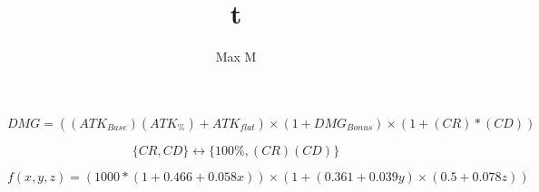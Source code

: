 \documentclass[a4paper]{article}
\title{t}
\author{Max M}
\begin{document}
\begin{equation}
	DMG = \left((ATK_{Base})(ATK_{\%}) + ATK_{flat}\right)\times (1 + DMG_{Bonus}) \times (1 + (CR)*(CD)) 
\end{equation}

\begin{equation}
	\{CR, CD\} \longleftrightarrow \{100\%, (CR)(CD)\}
\end{equation}


\begin{equation}
	f(x,y,z) = (1000*(1 + 0.466 + 0.058x))\times(1 + (0.361 + 0.039y)\times(0.5 + 0.078z))
\end{equation}
\end{document}
